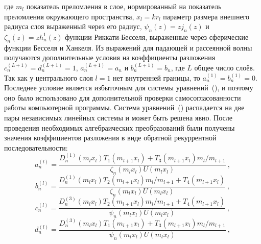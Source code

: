 где $m_l$ показатель преломления в слое, нормированный на показатель
преломления окружающего пространства, $x_l=kr_l$ параметр размера
внешнего радиуса слоя выраженный через его радиус,
$\psi_{n}(z) = z j_n(z)$ и $\zeta_{n}(z) = z h_n^1(z)$ функции
Риккати-Бесселя, выраженные через сферические функции Бесселя и
Ханкеля.  Из выражений для падающей и рассеянной волны получаются
дополнительные условия на коэффициенты разложения
$c_n^{(L+1)}=d_n^{(L+1)}=1$, $a_n^{(L+1)}=a_n$ и $b_n^{(L+1)}=b_n$,
где $L$ общее число слоёв. Так как у центрального слоя $l=1$ нет
внутренней границы, то $a_n^{(1)}=b_n^{(1)}=0$. Последнее условие
является избыточным для системы
уравнений~(), и поэтому оно
было использовано для дополнительной проверки самосогласованности
работы компьютерной программы.  Система
уравнений~() распадается на
две пары независимых линейных системы и может быть решена явно. После
проведения необходимых алгебраических преобразований были получены
значения коэффициентов разложения в виде обратной рекуррентной
последовательности:
\begin{equation}
\label{eq:6p1}
a^{(l)}_n = \frac
{
    {D^{(1)}_{n}}{\left (m_{l} x_{l} \right )}
    T_1\left (m_{l+1} x_{l} \right )
    +
    T_3\left (m_{l+1} x_{l} \right )
    m_{l}/m_{l+1}
}
{
   \zeta_{n}\left (m_{l} x_{l} \right )
   U\left (m_{l} x_{l} \right )
}\:,
\end{equation}
\begin{equation}
\label{eq:6p2}
b^{(l)}_n = \frac
{
    {D^{(1)}_{n}}{\left (m_{l} x_{l} \right )}
    T_2\left (m_{l+1} x_{l} \right )
    m_{l}/m_{l+1}
    +
    T_4\left (m_{l+1} x_{l} \right )
}
{
   \zeta_{n}\left (m_{l} x_{l} \right )
   U\left (m_{l} x_{l} \right )
}\:,
\end{equation}
\begin{equation}
\label{eq:6p3}
c^{(l)}_n = \frac
{
    {D^{(3)}_{n}}{\left (m_{l} x_{l} \right )}
    T_2\left (m_{l+1} x_{l} \right )
    m_{l}/m_{l+1}
    +
    T_4\left (m_{l+1} x_{l} \right )
}
{
   \psi_{n}\left (m_{l} x_{l} \right )
   U\left (m_{l} x_{l} \right )
}\:,
\end{equation}
\begin{equation}
\label{eq:6p4}
d^{(l)}_n = \frac
{
    {D^{(3)}_{n}}{\left (m_{l} x_{l} \right )}
    T_1\left (m_{l+1} x_{l} \right )
    +
    T_3\left (m_{l+1} x_{l} \right )
    m_{l}/m_{l+1}
}
{
   \psi_{n}\left (m_{l} x_{l} \right )
   U\left (m_{l} x_{l} \right )
}\:,
\end{equation}
